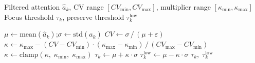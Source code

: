 \begin{algorithm}[t]
\caption{Adaptive Mask Thresholding via Coefficient of Variation}
\label{alg:adaptive_threshold}
\small
\begin{algorithmic}[1]
\Require Filtered attention $\hat{a}_k$, CV range $[\mathit{CV}_{\min}, \mathit{CV}_{\max}]$, multiplier range $[\kappa_{\min}, \kappa_{\max}]$
\Ensure Focus threshold $\tau_k$, preserve threshold $\tau_k^{\mathrm{low}}$

\State $\mu \gets \mathrm{mean}(\hat{a}_k)$;\quad $\sigma \gets \mathrm{std}(\hat{a}_k)$ 
\State $\mathit{CV} \gets \sigma\,/\,(\mu + \varepsilon)$ 
\State $\kappa \gets \kappa_{\max} - (\mathit{CV} - \mathit{CV}_{\min}) \cdot (\kappa_{\max} - \kappa_{\min})\,/\,(\mathit{CV}_{\max} - \mathit{CV}_{\min})$
\State $\kappa \gets \mathrm{clamp}(\kappa,\; \kappa_{\min},\; \kappa_{\max})$ 
\State $\tau_k \gets \mu + \kappa \cdot \sigma$ 
\State $\tau_k^{\mathrm{low}} \gets \mu - \kappa \cdot \sigma$ 
\State \Return $\tau_k,\; \tau_k^{\mathrm{low}}$
\end{algorithmic}
\end{algorithm}
